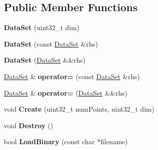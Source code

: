 \subsection*{Public Member Functions}
\begin{DoxyCompactItemize}
\item 
\hypertarget{struct_d_r_d_s_p_1_1_data_set_ae1212b5491e3c0a478da1910952e2bc2}{{\bfseries Data\-Set} (uint32\-\_\-t dim)}\label{struct_d_r_d_s_p_1_1_data_set_ae1212b5491e3c0a478da1910952e2bc2}

\item 
\hypertarget{struct_d_r_d_s_p_1_1_data_set_a54362d191e61148507f2fca3b4558cc3}{{\bfseries Data\-Set} (const \hyperlink{struct_d_r_d_s_p_1_1_data_set}{Data\-Set} \&rhs)}\label{struct_d_r_d_s_p_1_1_data_set_a54362d191e61148507f2fca3b4558cc3}

\item 
\hypertarget{struct_d_r_d_s_p_1_1_data_set_afb512480181cf243960cd6af9c8f07aa}{{\bfseries Data\-Set} (\hyperlink{struct_d_r_d_s_p_1_1_data_set}{Data\-Set} \&\&rhs)}\label{struct_d_r_d_s_p_1_1_data_set_afb512480181cf243960cd6af9c8f07aa}

\item 
\hypertarget{struct_d_r_d_s_p_1_1_data_set_a3cfc4b016689711854acd45637e893ef}{\hyperlink{struct_d_r_d_s_p_1_1_data_set}{Data\-Set} \& {\bfseries operator=} (const \hyperlink{struct_d_r_d_s_p_1_1_data_set}{Data\-Set} \&rhs)}\label{struct_d_r_d_s_p_1_1_data_set_a3cfc4b016689711854acd45637e893ef}

\item 
\hypertarget{struct_d_r_d_s_p_1_1_data_set_adc4d9c3292d47ee1b5ab110dd04e9166}{\hyperlink{struct_d_r_d_s_p_1_1_data_set}{Data\-Set} \& {\bfseries operator=} (\hyperlink{struct_d_r_d_s_p_1_1_data_set}{Data\-Set} \&\&rhs)}\label{struct_d_r_d_s_p_1_1_data_set_adc4d9c3292d47ee1b5ab110dd04e9166}

\item 
\hypertarget{struct_d_r_d_s_p_1_1_data_set_a714db7eb5bf512b3c1746e41da8e4859}{void {\bfseries Create} (uint32\-\_\-t num\-Points, uint32\-\_\-t dim)}\label{struct_d_r_d_s_p_1_1_data_set_a714db7eb5bf512b3c1746e41da8e4859}

\item 
\hypertarget{struct_d_r_d_s_p_1_1_data_set_a65d09f3c71c115517a5df8ce96f26117}{void {\bfseries Destroy} ()}\label{struct_d_r_d_s_p_1_1_data_set_a65d09f3c71c115517a5df8ce96f26117}

\item 
\hypertarget{struct_d_r_d_s_p_1_1_data_set_a0ffb95866863d3b2bad35b0c68c6c7f3}{bool {\bfseries Load\-Binary} (const char $\ast$filename)}\label{struct_d_r_d_s_p_1_1_data_set_a0ffb95866863d3b2bad35b0c68c6c7f3}


\end{DoxyCompactItemize}
